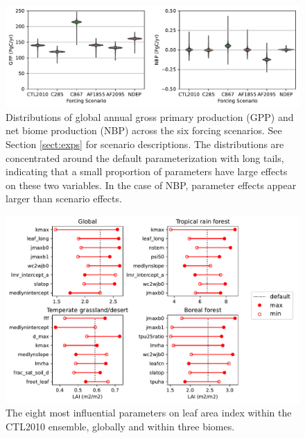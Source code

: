 \documentclass[draft]{agujournal2019}
\begin{document}
\begin{figure}[h]
\centering
\includegraphics[width=35pc]{../figs/violins.pdf}
\caption{Distributions of global annual gross primary production (GPP) and net biome production (NBP) across the six forcing scenarios. See Section \ref{sect:exps} for scenario descriptions. The distributions are concentrated around the default parameterization with long tails, indicating that a small proportion of parameters have large effects on these two variables. In the case of NBP, parameter effects appear larger than scenario effects.}
\label{}
\end{figure}

\begin{figure}[h]
\centering
\includegraphics[width=40pc]{../figs/lai_biome.pdf}
\caption{The eight most influential parameters on leaf area index within the CTL2010 ensemble, globally and within three biomes.}
\label{fig:lai}
\end{figure}
\end{document}
